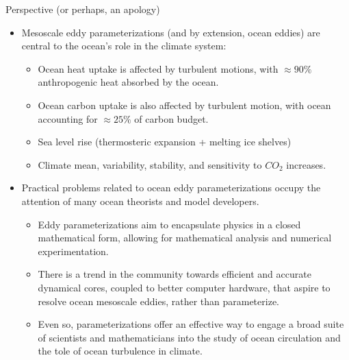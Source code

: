 \documentclass{beamer}
\begin{document}
\begin{frame}{Perspective (or perhaps, an apology)}

\begin{itemize}

\item[$\star$] Mesoscale eddy parameterizations (and by extension,
  ocean eddies) are central to the ocean's role in the climate system:
  \begin{itemize}
    \footnotesize
  \item[$\bullet$] Ocean heat uptake is affected by turbulent motions,
    with $\approx 90\%$ anthropogenic heat absorbed by the ocean.
  \item[$\bullet$] Ocean carbon uptake is also affected by turbulent
    motion, with ocean accounting for $\approx 25\%$ of carbon budget.
  \item[$\bullet$] Sea level rise (thermosteric expansion + melting ice shelves) 
  \item[$\bullet$] Climate mean, variability, stability, and
    sensitivity to $CO_2$ increases.
  \end{itemize}

  
\item[$\star$] Practical problems related to ocean eddy
  parameterizations occupy the attention of many ocean theorists and
  model developers.
    \begin{itemize}
  \footnotesize
   \item[$\bullet$] Eddy parameterizations aim to encapsulate physics
     in a closed mathematical form, allowing for mathematical analysis
     and numerical experimentation.
   \item[$\bullet$] There is a trend in the community towards
     efficient and accurate dynamical cores, coupled to better
     computer hardware, that aspire to resolve ocean mesoscale eddies,
     rather than parameterize.
    \item[$\bullet$] Even so, parameterizations offer an effective way
      to engage a broad suite of scientists and mathematicians into
      the study of ocean circulation and the tole of ocean turbulence
      in climate.
  \end{itemize}

\end{itemize}


\end{frame}
\end{document}
